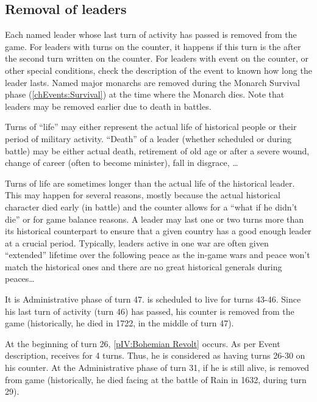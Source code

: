 \subsection{Removal of leaders}
\aparag[Death]
Each named leader whose last turn of activity has passed is removed from the
game.
\bparag For leaders with turns on the counter, it happens if this turn is the
after the second turn written on the counter.
\bparag For leaders with event on the counter, or other special conditions,
check the description of the event to known how long the leader lasts.
\bparag Named major monarchs are removed during the Monarch Survival phase
(\ref{chEvents:Survival}) at the time where the Monarch dies.
\bparag Note that leaders may be removed earlier due to death in battles.

\begin{designnote}
  Turns of ``life'' may either represent the actual life of historical people
  or their period of military activity. ``Death'' of a leader (whether
  scheduled or during battle) may be either actual death, retirement of old
  age or after a severe wound, change of career (often to become minister),
  fall in disgrace, \ldots

  Turns of life are sometimes longer than the actual life of the historical
  leader. This may happen for several reasons, mostly because the actual
  historical character died early (in battle) and the counter allows for a
  ``what if he didn't die'' or for game balance reasons. A leader may last one
  or two turns more than its historical counterpart to ensure that a given
  country has a good enough leader at a crucial period. Typically, leaders
  active in one war are often given ``extended'' lifetime over the following
  peace as the in-game wars and peace won't match the historical ones and
  there are no great historical generals during peaces\ldots
\end{designnote}

\begin{exemple}
  It is Administrative phase of turn 47.  is
  scheduled to live for turns 43-46. Since his last turn of activity (turn 46)
  has passed, his counter is removed from the game (historically, he died in
  1722, in the middle of turn 47).

  \smallskip

  At the beginning of turn 26, \ref{pIV:Bohemian Revolt} occurs. As per Event
  description, \paysBaviere receives  for 4 turns. Thus,
  he is considered as having turns 26-30 on his counter. At the Administrative
  phase of turn 31, if he is still alive, \leaderTilly is removed from game
  (historically, he died facing  at the battle of Rain in
  1632, during turn 29).
\end{exemple}

